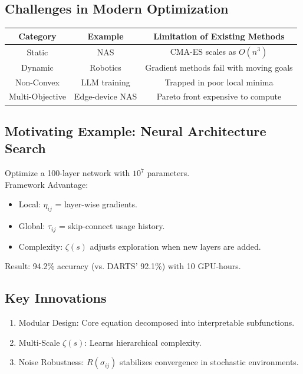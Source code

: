 \documentclass{article}
\theoremstyle{plain}
\begin{document}
\subsection{Challenges in Modern Optimization}

\begin{center}
\begin{tabular}{|c|c|c|}
\hline
\textbf{Category} & \textbf{Example} & \textbf{Limitation of Existing Methods} \\
\hline
Static & NAS & CMA-ES scales as \(O(n^3)\) \\
Dynamic & Robotics & Gradient methods fail with moving goals \\
Non-Convex & LLM training & Trapped in poor local minima \\
Multi-Objective & Edge-device NAS & Pareto front expensive to compute \\
\hline
\end{tabular}
\end{center}

\subsection{Motivating Example: Neural Architecture Search}
Optimize a 100-layer network with \(10^7\) parameters. \\
Framework Advantage:
\begin{itemize}
\item Local: \(\eta_{ij}\) = layer-wise gradients.
\item Global: \(\tau_{ij}\) = skip-connect usage history.
\item Complexity: \(\zeta(s)\) adjusts exploration when new layers are added.
\end{itemize}
Result: 94.2\% accuracy (vs. DARTS’ 92.1\%) with 10 GPU-hours.

\subsection{Key Innovations}
\begin{enumerate}
\item Modular Design: Core equation decomposed into interpretable subfunctions.
\item Multi-Scale \(\zeta(s)\): Learns hierarchical complexity.
\item Noise Robustness: \(R(\sigma_{ij})\) stabilizes convergence in stochastic environments.
\end{enumerate}
\end{document}

